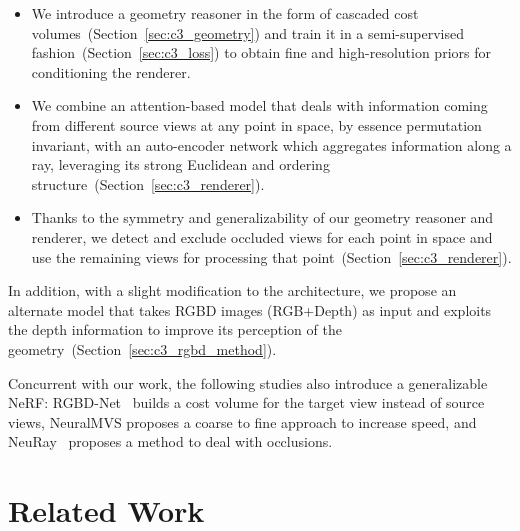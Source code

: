 \begin{itemize}
\item We introduce a geometry reasoner in the form of cascaded cost volumes~(Section~\ref{sec:c3_geometry}) and train it in a semi-supervised fashion~(Section~\ref{sec:c3_loss}) to obtain fine and high-resolution priors for conditioning the renderer.

\item We combine an attention-based model that deals with information coming from different source views at any point in space, by essence permutation invariant, with an auto-encoder network which aggregates information along a ray, leveraging its strong Euclidean and ordering structure~(Section~\ref{sec:c3_renderer}).

\item Thanks to the symmetry and generalizability of our geometry reasoner and renderer, we detect and exclude occluded views for each point in space and use the remaining views for processing that point~(Section~\ref{sec:c3_renderer}). 

\end{itemize}

In addition, with a slight modification to the architecture, we propose an alternate model that takes RGBD images (RGB+Depth) as input and exploits the depth information to improve its perception of the geometry~(Section~\ref{sec:c3_rgbd_method}).

Concurrent with our work, the following studies also introduce a generalizable NeRF: RGBD-Net~\citep{nguyen2021rgbd} builds a cost volume for the target view instead of source views, NeuralMVS\citep{rosu2022neuralmvs} proposes a coarse to fine approach to increase speed, and NeuRay~\cite{liu2022neural} proposes a method to deal with occlusions.

\section{Related Work} \label{sec:c3_related}

